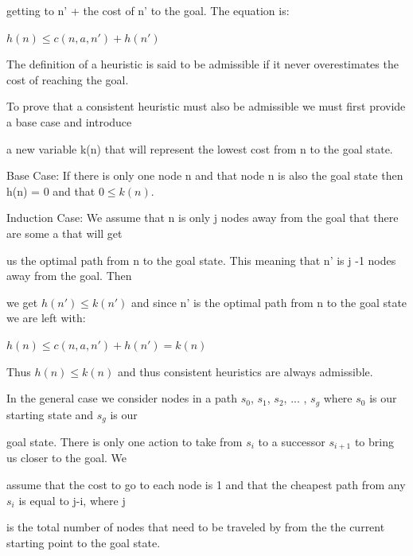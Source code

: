 \documentclass{article}
\begin{document}
\par 
getting to n' + the cost of n' to the goal. The equation is:
\par
\centerline{$h(n)\leq c(n,a,n') + h(n')$}
\par
The definition of a heuristic is said to be admissible if it never overestimates the cost of reaching the goal.
\par
To prove that a consistent heuristic must also be admissible we must first provide a base case and introduce 
\par 
a new variable k(n) that will represent the lowest cost from n to the goal state.
\newline
\par
Base Case: If there is only one node n and that node n is also the goal state then h(n) = 0 and that $0 \leq k(n)$.
\par
Induction Case: We assume that n is only j nodes away from the goal that there are some a that will get 
\par
us the optimal path from n to the goal state. This meaning that n' is j -1 nodes away from the goal. Then 
\par
we get $h(n')\leq k(n')$ and since n' is the optimal path from n to the goal state we are left with:
\par
\centerline{$h(n)\leq c(n,a,n') + h(n') = k(n)$}
\par 
Thus $h(n)\leq k(n)$ and thus consistent heuristics are
always admissible.
\newline
\par
{}
\par
In the general case we consider nodes in a path $s_{0}$, $s_{1}$, $s_{2}$, ... , $s_{g}$ where $s_{0}$ is our starting state and $s_{g}$ is our 
\par
goal state. There is only one action to take from $s_{i}$ to a successor $s_{i+1}$ to bring us closer to the goal. We 
\par
assume that the cost to go to each node is 1 and that the cheapest path from any $s_{i}$ is equal to j-i, where j 
\par
is the total number of nodes that need to be traveled by from the the current starting point to the goal state. 
\par
\end{document}

